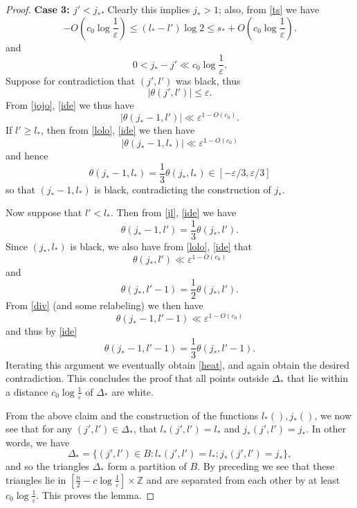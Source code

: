 \documentclass[12pt,a4paper,reqno]{amsart}
\numberwithin{equation}{section}
\theoremstyle{plain}
\theoremstyle{definition}
\newcommand\Z{\mathbb{Z}}
\newcommand\eps{\varepsilon}
\begin{document}
\begin{proof}
\textbf{Case 3: $j' < j_*$.}  Clearly this implies $j_* > 1$; also, from \eqref{ts} we have
\begin{equation}\label{lolo}
 - O\left(c_0 \log \frac{1}{\eps} \right) \leq (l_*-l') \log 2 \leq s_* + O\left(c_0 \log \frac{1}{\eps}\right).
\end{equation}
and
\begin{equation}\label{jojo}
 0 < j_* - j' \ll c_0 \log \frac{1}{\eps}.
\end{equation}
Suppose for contradiction that $(j',l')$ was black, thus
$$ |\theta(j',l')|  \leq \eps.$$
From \eqref{jojo}, \eqref{ide} we thus have
\begin{equation}\label{jl}
 |\theta(j_*-1,l')| \ll \eps^{1-O(c_0)}.
\end{equation}
If $l' \geq l_*$, then from \eqref{lolo}, \eqref{ide} we then have
$$ |\theta(j_*-1,l_*)| \ll \eps^{1-O(c_0)}$$
and hence
\begin{equation}\label{heat}
 \theta(j_*-1,l_*) = \frac{1}{3} \theta(j_*,l_*) \in [-\eps/3,\eps/3]
\end{equation}
so that $(j_*-1,l_*)$ is black, contradicting the construction of $j_*$.  

Now suppose that $l' < l_*$. Then from \eqref{jl}, \eqref{ide} we have
$$ \theta(j_*-1,l') = \frac{1}{3} \theta(j_*, l').$$
Since $(j_*,l_*)$ is black, we also have from \eqref{lolo}, \eqref{ide} that
$$ \theta(j_*,l') \ll \eps^{1-O(c_0)}$$
and
$$ \theta(j_*,l'-1) = \frac{1}{2} \theta(j_*,l').$$
From \eqref{div} (and some relabeling) we then have
$$ \theta(j_*-1,l'-1) \ll \eps^{1-O(c_0)}$$
and thus by \eqref{ide}
$$ \theta(j_*-1,l'-1) = \frac{1}{3} \theta(j_*, l'-1).$$
Iterating this argument we eventually obtain \eqref{heat}, and again obtain the desired contradiction.  This concludes the proof that all points outside $\Delta_*$ that lie within a distance $c_0 \log \frac{1}{\eps}$ of $\Delta_*$ are white.

From the above claim and the construction of the functions $l_*(), j_*()$, we now see that for any $(j',l') \in \Delta_*$, that $l_*(j',l') = l_*$ and $j_*(j',l') = j_*$.  In other words, we have
$$ \Delta_* = \{ (j',l') \in B: l_*(j',l') = l_*; j_*(j',l') = j_* \},$$
and so the triangles $\Delta_*$ form a partition of $B$.  By preceding we see that these triangles lie in $[\frac{n}{2} - c \log \frac{1}{\eps}] \times \Z$ and are separated from each other by at least $c_0 \log \frac{1}{\eps}$.  This proves the lemma.
\end{proof}
\end{document}
